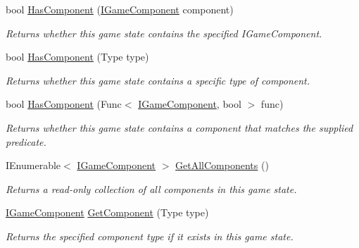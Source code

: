 \begin{DoxyCompactItemize}
bool \hyperlink{class_tri_devs_1_1_tri_engine2_d_1_1_state_management_1_1_game_state_af9248f0b37ff14a01b4a4e8365fa79c9}{Has\-Component} (\hyperlink{interface_tri_devs_1_1_tri_engine2_d_1_1_interfaces_1_1_i_game_component}{I\-Game\-Component} component)
\begin{DoxyCompactList}\small\item\em Returns whether this game state contains the specified I\-Game\-Component. \end{DoxyCompactList}\item 
bool \hyperlink{class_tri_devs_1_1_tri_engine2_d_1_1_state_management_1_1_game_state_af939166ddc88eeba03831893ff67de0d}{Has\-Component} (Type type)
\begin{DoxyCompactList}\small\item\em Returns whether this game state contains a specific type of component. \end{DoxyCompactList}\item 
bool \hyperlink{class_tri_devs_1_1_tri_engine2_d_1_1_state_management_1_1_game_state_a39f7799bc961aab20a70fedc9af698af}{Has\-Component} (Func$<$ \hyperlink{interface_tri_devs_1_1_tri_engine2_d_1_1_interfaces_1_1_i_game_component}{I\-Game\-Component}, bool $>$ func)
\begin{DoxyCompactList}\small\item\em Returns whether this game state contains a component that matches the supplied predicate. \end{DoxyCompactList}\item 
I\-Enumerable$<$ \hyperlink{interface_tri_devs_1_1_tri_engine2_d_1_1_interfaces_1_1_i_game_component}{I\-Game\-Component} $>$ \hyperlink{class_tri_devs_1_1_tri_engine2_d_1_1_state_management_1_1_game_state_a475ae428f7c2c7ef10fa2cb12f3c6574}{Get\-All\-Components} ()
\begin{DoxyCompactList}\small\item\em Returns a read-\/only collection of all components in this game state. \end{DoxyCompactList}\item 
\hyperlink{interface_tri_devs_1_1_tri_engine2_d_1_1_interfaces_1_1_i_game_component}{I\-Game\-Component} \hyperlink{class_tri_devs_1_1_tri_engine2_d_1_1_state_management_1_1_game_state_a26a8b145ad9d81584b379f2ff3bfb96c}{Get\-Component} (Type type)
\begin{DoxyCompactList}\small\item\em Returns the specified component type if it exists in this game state. \end{DoxyCompactList}\item 

\end{DoxyCompactItemize}
